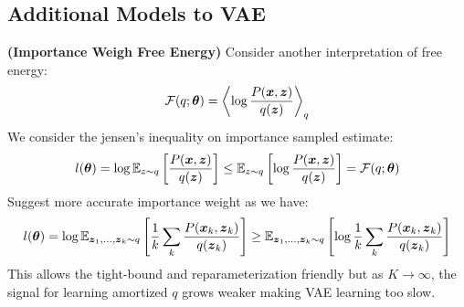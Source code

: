 \subsection{Additional Models to VAE}

\begin{definition}{\textbf{(Importance Weigh Free Energy)}}
    Consider another interpretation of free energy:
    \begin{equation*}
        \mathcal{F}(q;\boldsymbol \theta) = \left\langle \log \frac{P(\boldsymbol x, \boldsymbol z)}{q(\boldsymbol z)} \right\rangle_{q}
    \end{equation*}
    We consider the jensen's inequality on importance sampled estimate:
    \begin{equation*}
        l(\boldsymbol \theta) = \log \mathbb{E}_{z\sim q}\left[ \frac{P(\boldsymbol x, \boldsymbol z)}{q(\boldsymbol z)} \right] \le \mathbb{E}_{z\sim q}\left[ \log \frac{P(\boldsymbol x, \boldsymbol z)}{q(\boldsymbol z)} \right] = \mathcal{F}(q;\boldsymbol \theta)
    \end{equation*}
    Suggest more accurate importance weight as we have:
    \begin{equation*}
        l(\boldsymbol \theta) = \log \mathbb{E}_{\boldsymbol z_1,\dots,\boldsymbol z_k \sim q} \left[ \frac{1}{k}\sum_k \frac{P(\boldsymbol x_k, \boldsymbol z_k)}{q(\boldsymbol z_k)} \right] \ge  \mathbb{E}_{\boldsymbol z_1,\dots,\boldsymbol z_k \sim q} \left[ \log \frac{1}{k}\sum_k \frac{P(\boldsymbol x_k, \boldsymbol z_k)}{q(\boldsymbol z_k)} \right]
    \end{equation*}
    This allows the tight-bound and reparameterization friendly but as $K\rightarrow\infty$, the signal for learning amortized $q$ grows weaker making VAE learning too slow. 
\end{definition}

